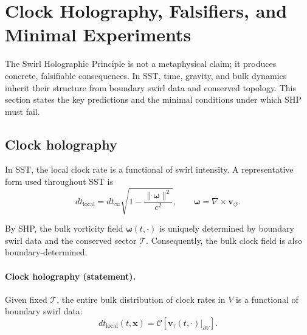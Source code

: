 \documentclass[11pt]{article}
\begin{document}
    \section{Clock Holography, Falsifiers, and Minimal Experiments}

    The Swirl Holographic Principle is not a metaphysical claim; it produces concrete,
    falsifiable consequences. In SST, time, gravity, and bulk dynamics inherit their
    structure from boundary swirl data and conserved topology. This section states the
    key predictions and the minimal conditions under which SHP must fail.

    \subsection{Clock holography}

        In SST, the local clock rate is a functional of swirl intensity. A representative
        form used throughout SST is
        \begin{equation}
            dt_{\mathrm{local}}
            =
            dt_{\infty}
            \sqrt{1 - \frac{\lVert \boldsymbol{\omega} \rVert^2}{c^2}},
            \qquad
            \boldsymbol{\omega}=\nabla\times\mathbf{v}_{\!\boldsymbol{\circlearrowleft}}.
        \end{equation}

        By SHP, the bulk vorticity field $\boldsymbol{\omega}(t,\cdot)$ is uniquely
        determined by boundary swirl data and the conserved sector $\mathcal{T}$.
        Consequently, the bulk clock field is also boundary-determined.

        \paragraph{Clock holography (statement).}
            Given fixed $\mathcal{T}$, the entire bulk distribution of clock rates in $V$ is a
            functional of boundary swirl data:
            \begin{equation}
                dt_{\mathrm{local}}(t,\mathbf{x})
                =
                \mathcal{C}\!\left[
                                 \mathbf{v}_\tau(t,\cdot)\big|_{\partial V}
                \right].
            \end{equation}
\end{document}
